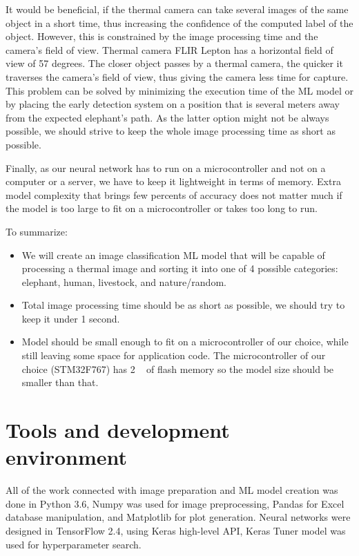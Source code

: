 It would be beneficial, if the thermal camera can take several images of the same object in a short time, thus increasing the confidence of the computed label of the object.
However, this is constrained by the image processing time and the camera's field of view.
Thermal camera FLIR Lepton has a horizontal field of view of 57 degrees.
The closer object passes by a thermal camera, the quicker it traverses the camera's field of view, thus giving the camera less time for capture.
This problem can be solved by minimizing the execution time of the ML model or by placing the early detection system on a position that is several meters away from the expected elephant's path.
As the latter option might not be always possible, we should strive to keep the whole image processing time as short as possible.

Finally, as our neural network has to run on a microcontroller and not on a computer or a server, we have to keep it lightweight in terms of memory.
Extra model complexity that brings few percents of accuracy does not matter much if the model is too large to fit on a microcontroller or takes too long to run.

To summarize:

\begin{itemize}
    \item We will create an image classification ML model that will be capable of processing a thermal image and sorting it into one of 4 possible categories: elephant, human, livestock, and nature/random.
    \item Total image processing time should be as short as possible, we should try to keep it under 1 second.
    \item Model should be small enough to fit on a microcontroller of our choice, while still leaving some space for application code. The microcontroller of our choice (STM32F767) has 2 \si{\mega\byte} of flash memory so the model size should be smaller than that.
\end{itemize}


\section{ Tools and development environment}

All of the work connected with image preparation and ML model creation was done in Python 3.6, Numpy was used for image preprocessing, Pandas for Excel database manipulation, and Matplotlib for plot generation.
Neural networks were designed in TensorFlow 2.4, using Keras high-level API, Keras Tuner model was used for hyperparameter search.

